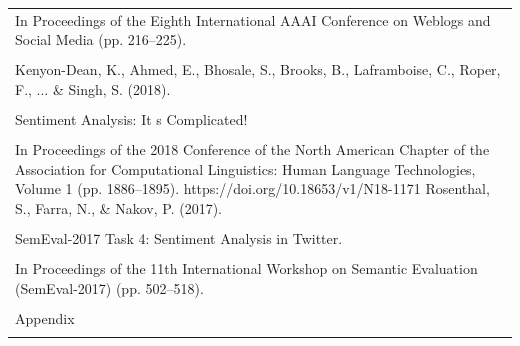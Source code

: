 \documentclass[11pt]{article}
\begin{document}
\begin{longtable}{|p{\dimexpr\linewidth-2\tabcolsep-2\arrayrulewidth\relax}|}
\hline
\rule{0pt}{3.5cm} \\
\hline
In Proceedings of the Eighth International AAAI Conference on Weblogs and Social Media (pp. 216--225). \\[2pt]
\hline
\rule{0pt}{3.5cm} \\
\hline
Kenyon-Dean, K., Ahmed, E., Bhosale, S., Brooks, B., Laframboise, C., Roper, F., ... \& Singh, S. (2018). \\[2pt]
\hline
\rule{0pt}{3.5cm} \\
\hline
Sentiment Analysis: It s Complicated! \\[2pt]
\hline
\rule{0pt}{3.5cm} \\
\hline
In Proceedings of the 2018 Conference of the North American Chapter of the Association for Computational Linguistics: Human Language Technologies, Volume 1 (pp. 1886--1895). https://doi.org/10.18653/v1/N18-1171 Rosenthal, S., Farra, N., \& Nakov, P. (2017). \\[2pt]
\hline
\rule{0pt}{3.5cm} \\
\hline
SemEval-2017 Task 4: Sentiment Analysis in Twitter. \\[2pt]
\hline
\rule{0pt}{3.5cm} \\
\hline
In Proceedings of the 11th International Workshop on Semantic Evaluation (SemEval-2017) (pp. 502--518). \\[2pt]
\hline
\rule{0pt}{3.5cm} \\
\hline
Appendix \\[2pt]
\hline
\rule{0pt}{3.5cm} \\
\hline
\end{longtable}
\end{document}
